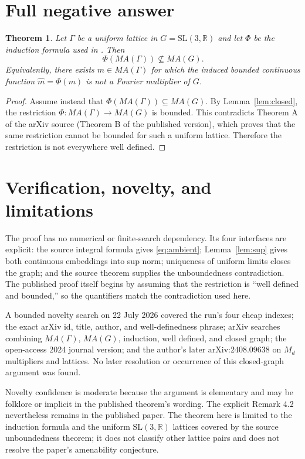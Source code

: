 \documentclass[11pt]{article}
\newtheorem{theorem}{Theorem}
\newcommand{\MA}{M\!A}
\begin{document}
\section{Full negative answer}

\begin{theorem}\label{thm:main}
Let $\Gamma$ be a uniform lattice in $G=\mathrm{SL}(3,\mathbb R)$ and let
$\Phi$ be the induction formula used in \cite{Battseren}.  Then
\[
 \Phi(\MA(\Gamma))\not\subseteq\MA(G).
\]
Equivalently, there exists $m\in\MA(\Gamma)$ for which the induced bounded
continuous function $\widehat m=\Phi(m)$ is not a Fourier multiplier of $G$.
\end{theorem}

\begin{proof}
Assume instead that $\Phi(\MA(\Gamma))\subseteq\MA(G)$.  By
Lemma~\ref{lem:closed}, the restriction
$\Phi:\MA(\Gamma)\to\MA(G)$ is bounded.  This contradicts Theorem A of the
arXiv source (Theorem B of the published version), which proves that the same
restriction cannot be bounded for such a uniform lattice.  Therefore the
restriction is not everywhere well defined.
\end{proof}

\section{Verification, novelty, and limitations}

The proof has no numerical or finite-search dependency.  Its four interfaces
are explicit: the source integral formula gives \eqref{eq:ambient};
Lemma~\ref{lem:sup} gives both continuous embeddings into sup norm; uniqueness
of uniform limits closes the graph; and the source theorem supplies the
unboundedness contradiction.  The published proof itself begins by assuming
that the restriction is ``well defined and bounded,'' so the quantifiers match
the contradiction used here.

A bounded novelty search on 22 July 2026 covered the run's four cheap indexes;
the exact arXiv id, title, author, and well-definedness phrase; arXiv searches
combining $\MA(\Gamma)$, $\MA(G)$, induction, well defined, and closed graph;
the open-access 2024 journal version; and the author's later arXiv:2408.09638 on
$M_d$ multipliers and lattices.  No later resolution or occurrence of this
closed-graph argument was found.

Novelty confidence is moderate because the argument is elementary and may be
folklore or implicit in the published theorem's wording.  The explicit Remark
4.2 nevertheless remains in the published paper.  The theorem here is limited
to the induction formula and the uniform $\mathrm{SL}(3,\mathbb R)$ lattices
covered by the source unboundedness theorem; it does not classify other
lattice pairs and does not resolve the paper's amenability conjecture.
\end{document}
